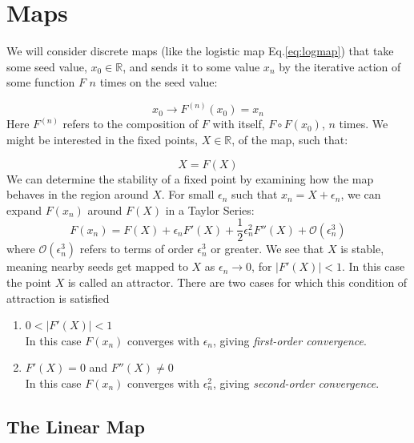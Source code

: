 \documentclass[paper=a4, fontsize=11pt, abstract=on]{scrartcl} %
\numberwithin{equation}{section}
\numberwithin{figure}{section}
\numberwithin{table}{section}
\begin{document}
\section{Maps}
\label{sec:map}

We will consider discrete maps (like the logistic map
Eq.\ref{eq:logmap}) that take some seed value, $x_0\in \mathbb{R}$, and sends it to
some value $x_n$ by the iterative action of some function $F$ $n$
times on the seed value:

\begin{equation}
  \label{eq:map}
  x_0 \rightarrow F^{(n)}(x_0) = x_n 
\end{equation}
Here $F^{(n)}$ refers to the composition of $F$ with itself,
$F \circ F(x_0)$, $n$ times. We might be interested in the fixed
points, $X\in \mathbb{R}$, of the map, such that:

\begin{equation}
  \label{eq:fixed}
  X = F(X)
\end{equation}
We can determine the stability of a fixed point by examining how the
map behaves in the region around $X$. For small $\epsilon_n$ such that
$x_n = X + \epsilon_n$, we can expand $F(x_n)$ around $F(X)$ in a
Taylor Series: 
\begin{equation}
  \label{eq:taylor}
  F(x_n) = F(X) + \epsilon_n F'(X) + \frac{1}{2}\epsilon_n^2F''(X) + \mathcal{O}(\epsilon_n^3)
\end{equation}
where $\mathcal{O}(\epsilon_n^3)$ refers to terms of order
$\epsilon_n^3$ or greater. We see that $X$ is stable, meaning nearby
seeds get mapped to $X$ as $\epsilon_n\rightarrow 0$, for $|F'(X)| <
1$. In this case the point $X$ is called an attractor. There are two
cases for which this condition of attraction is satisfied
\begin{enumerate}
\item $0 < |F'(X)| < 1$ \\
  In this case $F(x_n)$ converges with $\epsilon_n$, giving
  \emph{first-order convergence}.
\item $ F'(X) = 0$ and $F''(X)\not= 0$\\
  In this case $F(x_n)$ converges with $\epsilon_n^2$, giving
  \emph{second-order convergence}.
\end{enumerate}

\subsection{The Linear Map}
\label{sec:linmap}
\end{document}
